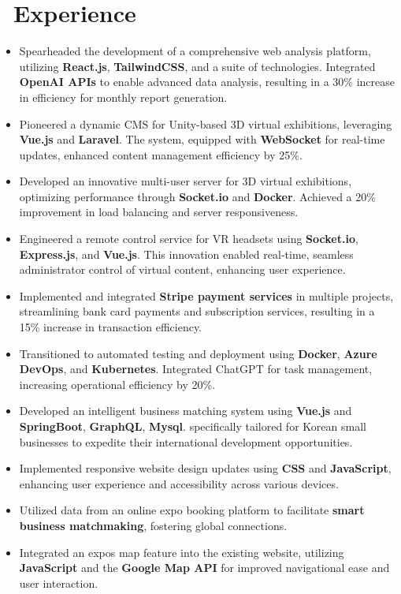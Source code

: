 \documentclass{resume}
\begin{document}
\section{\faUsers\ Experience}
\begin{itemize}[noitemsep]
  \item Spearheaded the development of a comprehensive web analysis platform, utilizing \textbf{React.js}, \textbf{TailwindCSS}, and a suite of technologies. Integrated \textbf{OpenAI APIs} to enable advanced data analysis, resulting in a 30\% increase in efficiency for monthly report generation.
  \item Pioneered a dynamic CMS for Unity-based 3D virtual exhibitions, leveraging \textbf{Vue.js} and \textbf{Laravel}. The system, equipped with \textbf{WebSocket} for real-time updates, enhanced content management efficiency by 25\%.
  \item Developed an innovative multi-user server for 3D virtual exhibitions, optimizing performance through \textbf{Socket.io} and \textbf{Docker}. Achieved a 20\% improvement in load balancing and server responsiveness.
  \item Engineered a remote control service for VR headsets using \textbf{Socket.io}, \textbf{Express.js}, and \textbf{Vue.js}. This innovation enabled real-time, seamless administrator control of virtual content, enhancing user experience.
  \item Implemented and integrated \textbf{Stripe payment services} in multiple projects, streamlining bank card payments and subscription services, resulting in a 15\% increase in transaction efficiency.
  \item Transitioned to automated testing and deployment using \textbf{Docker}, \textbf{Azure DevOps}, and \textbf{Kubernetes}. Integrated ChatGPT for task management, increasing operational efficiency by 20\%.
\end{itemize}

\begin{itemize}
  \item Developed an intelligent business matching system using \textbf{Vue.js} and \textbf{SpringBoot}, \textbf{GraphQL}, \textbf{Mysql}. specifically tailored for Korean small businesses to expedite their international development opportunities.
  \item Implemented responsive website design updates using \textbf{CSS} and \textbf{JavaScript}, enhancing user experience and accessibility across various devices.
  \item Utilized data from an online expo booking platform to facilitate \textbf{smart business matchmaking}, fostering global connections.
  \item Integrated an expos map feature into the existing website, utilizing \textbf{JavaScript} and the \textbf{Google Map API} for improved navigational ease and user interaction.
\end{itemize}
\end{document}

